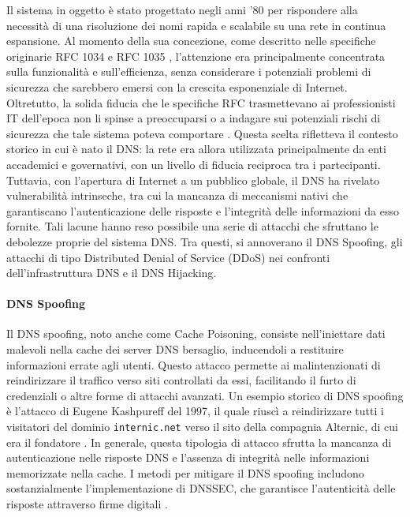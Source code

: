 Il sistema in oggetto è stato progettato negli anni '80 per rispondere alla necessità di una risoluzione dei nomi rapida e scalabile su una rete in continua espansione. Al momento della sua concezione, come descritto nelle specifiche originarie RFC 1034 \cite{rfc1034} e RFC 1035 \cite{rfc1035}, l'attenzione era principalmente concentrata sulla funzionalità e sull'efficienza, senza considerare i potenziali problemi di sicurezza che sarebbero emersi con la crescita esponenziale di Internet. Oltretutto, la solida fiducia che le specifiche RFC trasmettevano ai professionisti IT dell’epoca non li spinse a preoccuparsi o a indagare sui potenziali rischi di sicurezza che tale sistema poteva comportare \cite{hudaib2014dns}. Questa scelta rifletteva il contesto storico in cui è nato il DNS: la rete era allora utilizzata principalmente da enti accademici e governativi, con un livello di fiducia reciproca tra i partecipanti. Tuttavia, con l'apertura di Internet a un pubblico globale, il DNS ha rivelato vulnerabilità intrinseche, tra cui la mancanza di meccanismi nativi che garantiscano l'autenticazione delle risposte e l'integrità delle informazioni da esso fornite. Tali lacune hanno reso possibile una serie di attacchi che sfruttano le debolezze proprie del sistema DNS. Tra questi, si annoverano il DNS Spoofing, gli attacchi di tipo Distributed Denial of Service (DDoS) nei confronti dell'infrastruttura DNS e il DNS Hijacking.

\paragraph{DNS Spoofing}
Il DNS spoofing, noto anche come Cache Poisoning, consiste nell'iniettare dati malevoli nella cache dei server DNS bersaglio, inducendoli a restituire informazioni errate agli utenti. Questo attacco permette ai malintenzionati di reindirizzare il traffico verso siti controllati da essi, facilitando il furto di credenziali o altre forme di attacchi avanzati. Un esempio storico di DNS spoofing è l'attacco di Eugene Kashpureff del 1997, il quale riuscì a reindirizzare tutti i visitatori del dominio \texttt{internic.net} verso il sito della compagnia Alternic, di cui era il fondatore \cite{lioy2000dns}. In generale, questa tipologia di attacco sfrutta la mancanza di autenticazione nelle risposte DNS e l'assenza di integrità nelle informazioni memorizzate nella cache. I metodi per mitigare il DNS spoofing includono sostanzialmente l'implementazione di DNSSEC, che garantisce l'autenticità delle risposte attraverso firme digitali \cite{rfc2535}.

